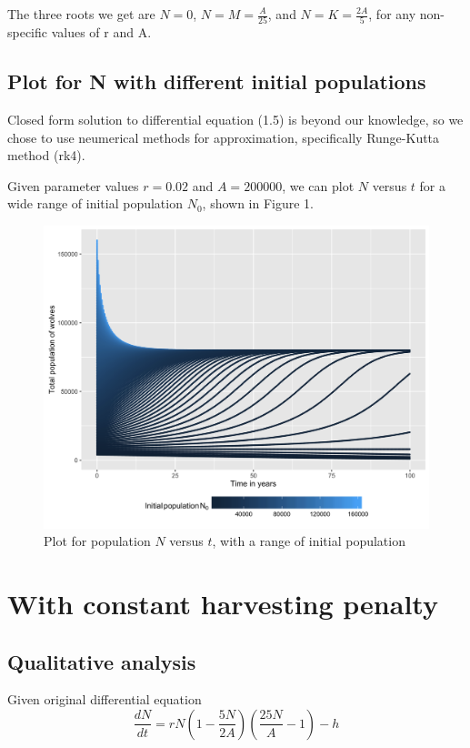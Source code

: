 \documentclass{amsart}
\theoremstyle{definition}
\theoremstyle{remark}
\numberwithin{equation}{section}
\newcommand{\blankbox}[2]{%
  \parbox{\columnwidth}{\centering
    \setlength{\fboxsep}{0pt}%
    \fbox{\raisebox{0pt}[#2]{\hspace{#1}}}%
  }%
}
\begin{document}
The three roots we get are $N=0$, $N=M=\frac{A}{25}$, and $N=K=\frac{2A}{5}$, for any non-specific values of r and A.

\subsection{Plot for N with different initial populations}
Closed form solution to differential equation (1.5) is beyond our knowledge, so we chose to use neumerical methods for approximation, specifically Runge-Kutta method (rk4).

Given parameter values $r=0.02$ and $A=200000$, we can plot $N$ versus $t$ for a wide range of initial population $N_0$, shown in Figure 1.

\begin{figure}[tb]
\includegraphics[scale=0.15]{variableN0.png}
\caption{Plot for population $N$ versus $t$, with a range of initial population}
\label{variable}
\end{figure}


\section{With constant harvesting penalty}
\subsection{Qualitative analysis}

Given original differential equation
\begin{equation}
    \frac{dN}{dt}=rN(1-\frac{5N}{2A})(\frac{25N}{A}-1)-h
\end{equation}
\end{document}
